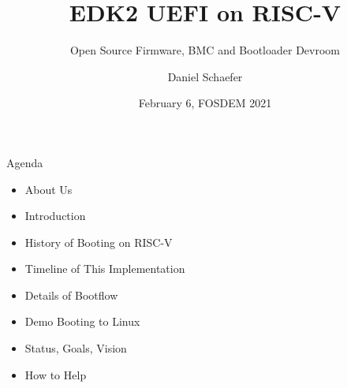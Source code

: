 \documentclass[
  10pt
]{beamer}
\title{EDK2 UEFI on RISC-V}
\subtitle{Open Source Firmware, BMC and Bootloader Devroom}
\date{February 6, FOSDEM 2021}
\author{Daniel Schaefer}
\begin{document}
\maketitle

\begin{frame}{Agenda}
  \begin{itemize}
    \item About Us
    \item Introduction
    \item History of Booting on RISC-V
    \item Timeline of This Implementation
    \item Details of Bootflow
    \item Demo Booting to Linux
    \item Status, Goals, Vision
    \item How to Help
  \end{itemize}
\end{frame}
\end{document}
